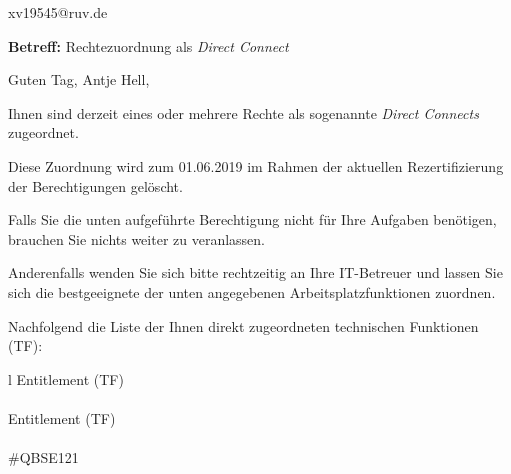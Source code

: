 \documentclass[a4paper,landscape,12pt]{letter}
\begin{document}
\begin{letter}{xv19545@ruv.de\hfill \break}
\begin{normalsize}
	\opening{\textbf{Betreff:} Rechtezuordnung als \emph{Direct Connect}}
	\begin{normalsize} \hfill
	\end{normalsize}

	\begin{normalsize}
		Guten Tag, 
	Antje Hell, \hfill \break
	\end{normalsize}
	\end{normalsize}
	
\begin{normalsize}
	Ihnen sind derzeit eines oder mehrere Rechte als sogenannte \emph{Direct Connects} zugeordnet.
	
	Diese Zuordnung wird zum 01.06.2019 im Rahmen der aktuellen Rezertifizierung der Berechtigungen gelöscht.
	
	Falls Sie die unten aufgeführte Berechtigung nicht für Ihre Aufgaben benötigen, 
	brauchen Sie nichts weiter zu veranlassen.
	
	Anderenfalls wenden Sie sich bitte rechtzeitig an Ihre IT-Betreuer 
	und lassen Sie sich die bestgeeignete der unten angegebenen Arbeitsplatzfunktionen zuordnen.
	\end{normalsize}
	
\begin{normalsize}
	Nachfolgend die Liste der Ihnen direkt zugeordneten technischen Funktionen (TF):

	\begin{longtable}{l}
		Entitlement (TF) \\ \hline
		\endfirsthead
		\\\hline
		Entitlement (TF) \\ \hline
		\endhead %
		\multicolumn{1}{r@{}}{Fortsetzung \ldots}\\
		\endfoot
		\hline
		\endlastfoot
	\#QBSE121\\
	\end{longtable}
	\end{normalsize}
	

\end{letter}
\end{document}
